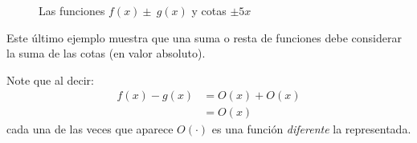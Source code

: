 \documentclass[spanish, fleqn]{article}
\begin{document}
  \begin{figure}[ht]
    \centering
    \caption{Las funciones \(f(x) \pm \: g(x)\) y cotas \(\pm 5 x\)}
    \label{fig:function-f+g}
  \end{figure}
  Este último ejemplo muestra que una suma o resta de funciones
  debe considerar la suma de las cotas
  (en valor absoluto).

  Note que al decir:
  \begin{align*}
    f(x) - g(x)
    &= O(x) + O(x) \\
    &= O(x)
  \end{align*}
  cada una de las veces que aparece \(O(\cdot)\)
  es una función \emph{diferente} la representada.
\end{document}
